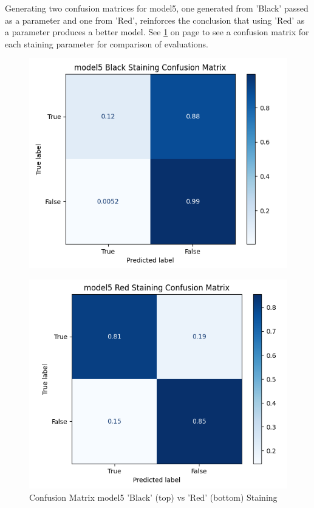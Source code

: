 \newpage

Generating two confusion matrices for model5, one generated from 'Black' passed as a parameter and one from 'Red', reinforces the conclusion that using 'Red' as a parameter produces a better model. See \ref{fig:x Confusion Matrix mode5 Red Staining} on page \pageref{fig:x Confusion Matrix mode5 Red Staining} to see a confusion matrix for each staining parameter for comparison of evaluations.

\begin{figure}[!htb]
    \centering
    \includegraphics[scale=0.6]{figures/m5_black_cm.png} 
    \label{fig:x Confusion Matrix mode5 Black Staining}
    
    \centering
    \includegraphics[scale=0.6]{figures/m5_red_cm.png} 
    \caption{Confusion Matrix model5 'Black' (top) vs 'Red' (bottom) Staining}
    \label{fig:x Confusion Matrix mode5 Red Staining}
\end{figure}

